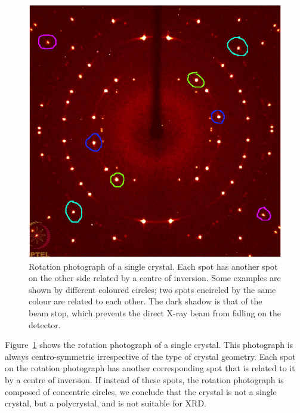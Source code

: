	\begin{figure}
		\centering
		\includegraphics[scale=0.3]{rotation_photograph_mod.png}
		\caption{\label{fig:rotation_photo}Rotation photograph of a single crystal. Each spot has another spot on the other side related by a centre of inversion. Some examples are shown by different coloured circles; two spots encircled by the same colour are related to each other. The dark shadow is that of the beam stop, which prevents the direct X-ray beam from falling on the detector.}
	\end{figure}
	
	Figure~\ref{fig:rotation_photo} shows the rotation photograph of a single crystal. This photograph is always centro-symmetric irrespective of the type of crystal geometry. Each spot on the rotation photograph has another corresponding spot that is related to it by a centre of inversion. If instead of these spots, the rotation photograph is composed of concentric circles, we conclude that the crystal is not a single crystal, but a polycrystal, and is not suitable for XRD.